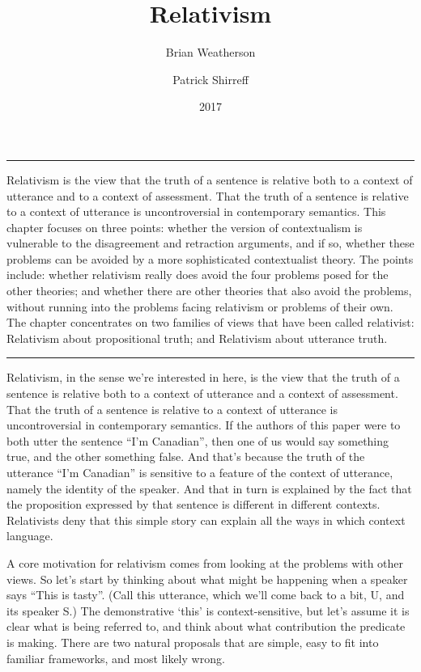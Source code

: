 \documentclass[
  10pt,
  letterpaper,
  DIV=11,
  numbers=noendperiod,
  twoside]{scrartcl}
\title{Relativism}
\author{Brian Weatherson \and Patrick Shirreff}
\date{2017}
\renewenvironment{abstract}
 {\vspace{-1.25cm}
 \quotation\small\noindent\rule{\linewidth}{.5pt}\par\smallskip
 \noindent }
 {\par\noindent\rule{\linewidth}{.5pt}\endquotation}
\begin{document}
\maketitle
\begin{abstract}
Relativism is the view that the truth of a sentence is relative both to
a context of utterance and to a context of assessment. That the truth of
a sentence is relative to a context of utterance is uncontroversial in
contemporary semantics. This chapter focuses on three points: whether
the version of contextualism is vulnerable to the disagreement and
retraction arguments, and if so, whether these problems can be avoided
by a more sophisticated contextualist theory. The points include:
whether relativism really does avoid the four problems posed for the
other theories; and whether there are other theories that also avoid the
problems, without running into the problems facing relativism or
problems of their own. The chapter concentrates on two families of views
that have been called relativist: Relativism about propositional truth;
and Relativism about utterance truth.
\end{abstract}


Relativism, in the sense we're interested in here, is the view that the
truth of a sentence is relative both to a context of utterance and a
context of assessment. That the truth of a sentence is relative to a
context of utterance is uncontroversial in contemporary semantics. If
the authors of this paper were to both utter the sentence ``I'm
Canadian'', then one of us would say something true, and the other
something false. And that's because the truth of the utterance ``I'm
Canadian'' is sensitive to a feature of the context of utterance, namely
the identity of the speaker. And that in turn is explained by the fact
that the proposition expressed by that sentence is different in
different contexts. Relativists deny that this simple story can explain
all the ways in which context language.

A core motivation for relativism comes from looking at the problems with
other views. So let's start by thinking about what might be happening
when a speaker says ``This is tasty''. (Call this utterance, which we'll
come back to a bit, U, and its speaker S.) The demonstrative `this' is
context-sensitive, but let's assume it is clear what is being referred
to, and think about what contribution the predicate is making. There are
two natural proposals that are simple, easy to fit into familiar
frameworks, and most likely wrong.
\end{document}
